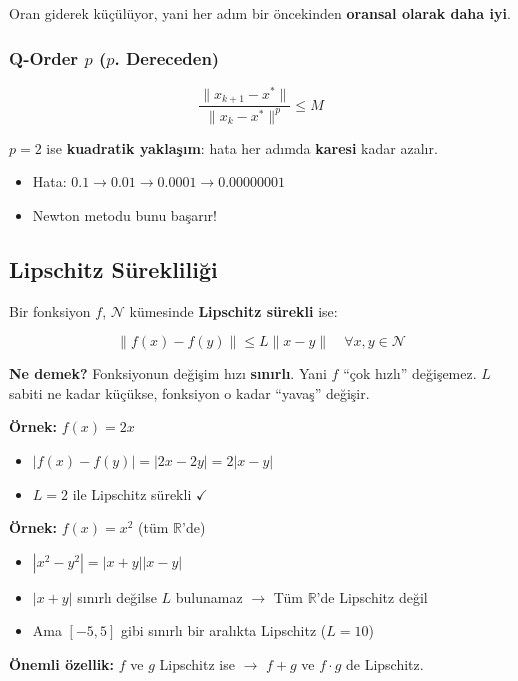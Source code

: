 \documentclass[12pt,a4paper]{article}
\theoremstyle{definition}
\theoremstyle{remark}
\begin{document}
Oran giderek k\"u\c{c}\"ul\"uyor, yani her ad{\i}m bir \"oncekinden \textbf{oransal olarak daha iyi}.

\subsubsection{Q-Order $p$ ($p$. Dereceden)}

\[
\frac{\|x_{k+1} - x^*\|}{\|x_k - x^*\|^p} \leq M
\]

$p = 2$ ise \textbf{kuadratik yakla\c{s}{\i}m}: hata her ad{\i}mda \textbf{karesi} kadar azal{\i}r.
\begin{itemize}
    \item Hata: $0.1 \to 0.01 \to 0.0001 \to 0.00000001$
    \item Newton metodu bunu ba\c{s}ar{\i}r!
\end{itemize}

\subsection{Lipschitz S\"ureklili\u{g}i}

Bir fonksiyon $f$, $\mathcal{N}$ k\"umesinde \textbf{Lipschitz s\"urekli} ise:

\[
\|f(x) - f(y)\| \leq L \|x - y\| \quad \forall x, y \in \mathcal{N}
\]

\textbf{Ne demek?} Fonksiyonun de\u{g}i\c{s}im h{\i}z{\i} \textbf{s{\i}n{\i}rl{\i}}. Yani $f$ ``\c{c}ok h{\i}zl{\i}'' de\u{g}i\c{s}emez.
$L$ sabiti ne kadar k\"u\c{c}\"ukse, fonksiyon o kadar ``yava\c{s}'' de\u{g}i\c{s}ir.

\textbf{\"Ornek:} $f(x) = 2x$
\begin{itemize}
    \item $|f(x) - f(y)| = |2x - 2y| = 2|x - y|$
    \item $L = 2$ ile Lipschitz s\"urekli $\checkmark$
\end{itemize}

\textbf{\"Ornek:} $f(x) = x^2$ (t\"um $\mathbb{R}$'de)
\begin{itemize}
    \item $|x^2 - y^2| = |x+y||x-y|$
    \item $|x+y|$ s{\i}n{\i}rl{\i} de\u{g}ilse $L$ bulunamaz $\to$ T\"um $\mathbb{R}$'de Lipschitz de\u{g}il
    \item Ama $[-5, 5]$ gibi s{\i}n{\i}rl{\i} bir aral{\i}kta Lipschitz ($L = 10$)
\end{itemize}

\textbf{\"Onemli \"ozellik:} $f$ ve $g$ Lipschitz ise $\to$ $f+g$ ve $f \cdot g$ de Lipschitz.
\end{document}
